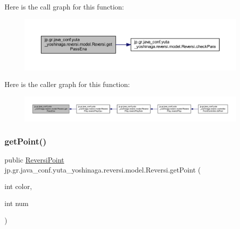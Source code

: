Here is the call graph for this function\+:
\nopagebreak
\begin{figure}[H]
\begin{center}
\leavevmode
\includegraphics[width=350pt]{classjp_1_1gr_1_1java__conf_1_1yuta__yoshinaga_1_1reversi_1_1model_1_1_reversi_aecdacb362bc174ee98b1013789461310_cgraph}
\end{center}
\end{figure}
Here is the caller graph for this function\+:
\nopagebreak
\begin{figure}[H]
\begin{center}
\leavevmode
\includegraphics[width=350pt]{classjp_1_1gr_1_1java__conf_1_1yuta__yoshinaga_1_1reversi_1_1model_1_1_reversi_aecdacb362bc174ee98b1013789461310_icgraph}
\end{center}
\end{figure}
\mbox{\label{classjp_1_1gr_1_1java__conf_1_1yuta__yoshinaga_1_1reversi_1_1model_1_1_reversi_ab180757b310c3a72cf159043ba0dc09e}} 
\subsubsection{\texorpdfstring{get\+Point()}{getPoint()}}
{\footnotesize\ttfamily public \hyperlink{classjp_1_1gr_1_1java__conf_1_1yuta__yoshinaga_1_1reversi_1_1model_1_1_reversi_point}{Reversi\+Point} jp.\+gr.\+java\+\_\+conf.\+yuta\+\_\+yoshinaga.\+reversi.\+model.\+Reversi.\+get\+Point (\begin{DoxyParamCaption}\item[{int}]{color,  }\item[{int}]{num }\end{DoxyParamCaption})}



